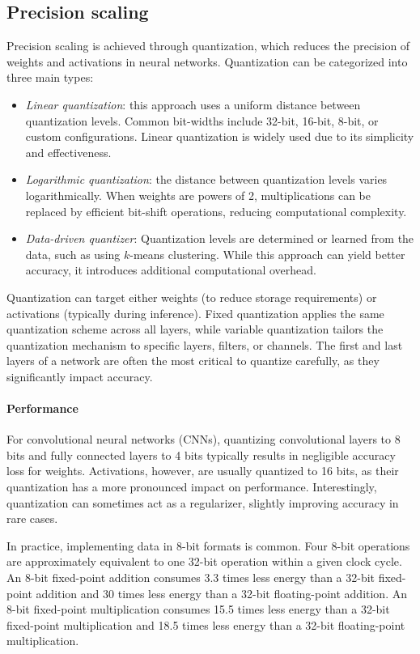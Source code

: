\subsection{Precision scaling}
Precision scaling is achieved through quantization, which reduces the precision of weights and activations in neural networks. 
Quantization can be categorized into three main types:
\begin{itemize}
    \item \textit{Linear quantization}: this approach uses a uniform distance between quantization levels. 
        Common bit-widths include 32-bit, 16-bit, 8-bit, or custom configurations. 
        Linear quantization is widely used due to its simplicity and effectiveness.
    \item \textit{Logarithmic quantization}: the distance between quantization levels varies logarithmically. 
        When weights are powers of 2, multiplications can be replaced by efficient bit-shift operations, reducing computational complexity.
    \item \textit{Data-driven quantizer}: Quantization levels are determined or learned from the data, such as using $k$-means clustering. 
        While this approach can yield better accuracy, it introduces additional computational overhead.
\end{itemize}
\noindent Quantization can target either weights (to reduce storage requirements) or activations (typically during inference). 
Fixed quantization applies the same quantization scheme across all layers, while variable quantization tailors the quantization mechanism to specific layers, filters, or channels. 
The first and last layers of a network are often the most critical to quantize carefully, as they significantly impact accuracy.

\paragraph*{Performance}
For convolutional neural networks (CNNs), quantizing convolutional layers to 8 bits and fully connected layers to 4 bits typically results in negligible accuracy loss for weights. 
Activations, however, are usually quantized to 16 bits, as their quantization has a more pronounced impact on performance. 
Interestingly, quantization can sometimes act as a regularizer, slightly improving accuracy in rare cases.

In practice, implementing data in 8-bit formats is common.
Four 8-bit operations are approximately equivalent to one 32-bit operation within a given clock cycle.
An 8-bit fixed-point addition consumes 3.3 times less energy than a 32-bit fixed-point addition and 30 times less energy than a 32-bit floating-point addition.
An 8-bit fixed-point multiplication consumes 15.5 times less energy than a 32-bit fixed-point multiplication and 18.5 times less energy than a 32-bit floating-point multiplication.

